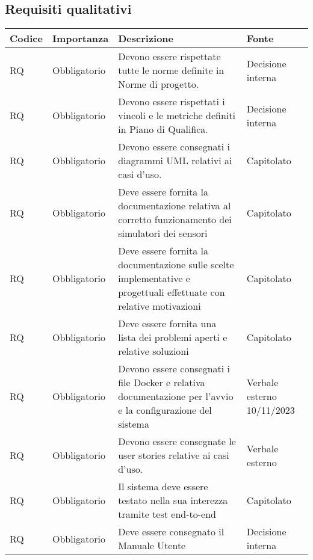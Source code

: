 \subsection{Requisiti qualitativi}
\setcounter{rowcounter}{0}
\begin{longtable}{|C{1cm}|C{2cm}|>{\raggedright}m{5cm}|C{2cm}|}
    \hline
    \textbf{Codice} & \textbf{Importanza} & \textbf{Descrizione} & \textbf{Fonte} \\
    \hline
    RQ & Obbligatorio &  Devono essere rispettate tutte le norme definite in Norme di progetto.  & Decisione interna \\
    \hline
     RQ & Obbligatorio &  Devono essere rispettati i vincoli e le metriche definiti in Piano di Qualifica.  & Decisione interna \\
    \hline
     RQ & Obbligatorio &  Devono essere consegnati i diagrammi UML relativi ai casi d'uso.  & Capitolato \\
    \hline
     RQ & Obbligatorio &  Deve essere fornita la documentazione relativa al corretto funzionamento dei simulatori dei sensori  & Capitolato \\
    \hline
     RQ & Obbligatorio & Deve essere fornita la documentazione sulle scelte implementative e progettuali effettuate con relative motivazioni  & Capitolato \\
    \hline
     RQ & Obbligatorio &  Deve essere fornita una lista dei problemi aperti e relative soluzioni & Capitolato \\
    \hline
     RQ & Obbligatorio &  Devono essere consegnati i file Docker e relativa documentazione per l'avvio e la configurazione del sistema & Verbale esterno 10/11/2023 \\
    \hline
     RQ & Obbligatorio &  Devono essere consegnate le user stories relative ai casi d'uso.  & Verbale esterno \\
    \hline
     RQ & Obbligatorio &  Il sistema deve essere testato nella sua interezza tramite test end-to-end  & Capitolato \\
    \hline
     RQ & Obbligatorio &  Deve essere consegnato il Manuale Utente & Decisione interna \\

\end{longtable}
